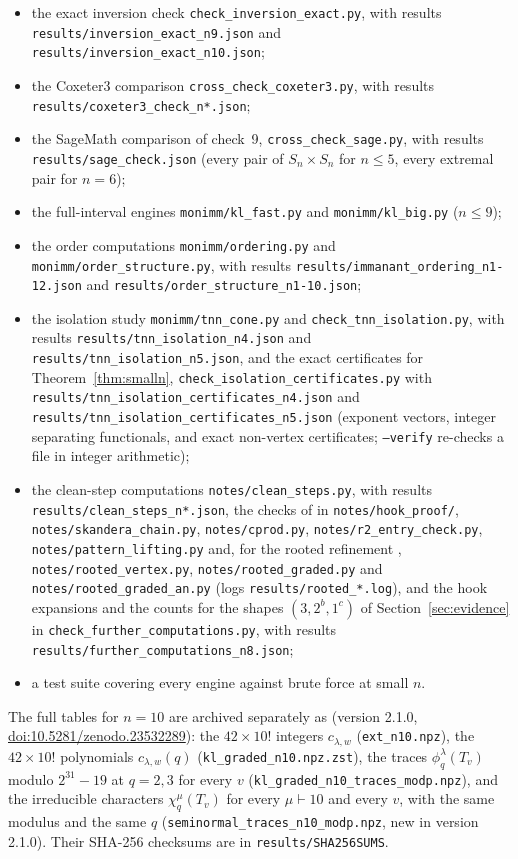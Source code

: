 \documentclass[11pt]{amsart}
\theoremstyle{definition}
\theoremstyle{remark}
\begin{document}
{\begin{itemize}
\item the exact inversion check \texttt{check\_inversion\_exact.py}, with results \texttt{results/inversion\_exact\_n9.json} and \texttt{results/inversion\_exact\_n10.json};
\item the \textsf{Coxeter3} comparison \texttt{cross\_check\_coxeter3.py}, with results \texttt{results/coxeter3\_check\_n*.json};
\item the SageMath comparison of check~9, \texttt{cross\_check\_sage.py}, with results \texttt{results/sage\_check.json} (every pair of $S_n\times S_n$ for $n\le5$, every extremal pair for $n=6$);
\item the full-interval engines \texttt{monimm/kl\_fast.py} and \texttt{monimm/kl\_big.py} ($n\le9$);
\item the order computations \texttt{monimm/ordering.py} and \texttt{monimm/order\_structure.py}, with results \texttt{results/immanant\_ordering\_n1-12.json} and \texttt{results/order\_structure\_n1-10.json};
\item the isolation study \texttt{monimm/tnn\_cone.py} and \texttt{check\_tnn\_isolation.py}, with results \texttt{results/tnn\_isolation\_n4.json} and \texttt{results/tnn\_isolation\_n5.json}, and the exact certificates for Theorem~\ref{thm:smalln}, \texttt{check\_isolation\_certificates.py} with \texttt{results/tnn\_isolation\_certificates\_n4.json} and \texttt{results/tnn\_isolation\_certificates\_n5.json} (exponent vectors, integer separating functionals, and exact non-vertex certificates; \texttt{--verify} re-checks a file in integer arithmetic);
\item the clean-step computations \texttt{notes/clean\_steps.py}, with results \texttt{results/clean\_steps\_n*.json}, the checks of \cite{McN} in \texttt{notes/hook\_proof/}, \texttt{notes/skandera\_chain.py}, \texttt{notes/cprod.py}, \texttt{notes/r2\_entry\_check.py}, \texttt{notes/pattern\_lifting.py} and, for the rooted refinement \cite[Conj.~10.2]{McN}, \texttt{notes/rooted\_vertex.py}, \texttt{notes/rooted\_graded.py} and \texttt{notes/rooted\_graded\_an.py} (logs \texttt{results/rooted\_*.log}), and the hook expansions and the counts for the shapes $(3,2^b,1^c)$ of Section~\ref{sec:evidence} in \texttt{check\_further\_computations.py}, with results \texttt{results/further\_computations\_n8.json};
\item a test suite covering every engine against brute force at small $n$.
\end{itemize}
The full tables for $n=10$ are archived separately as \cite{McNdata} (version 2.1.0, \href{https://doi.org/10.5281/zenodo.23532289}{doi:10.5281/zenodo.23532289}): the $42\times10!$ integers $c_{\lambda,w}$ (\texttt{ext\_n10.npz}), the $42\times10!$ polynomials $c_{\lambda,w}(q)$ (\texttt{kl\_graded\_n10.npz.zst}), the traces $\phi^\lambda_q(T_v)$ modulo $2^{31}-19$ at $q=2,3$ for every $v$ (\texttt{kl\_graded\_n10\_traces\_modp.npz}), and the irreducible characters $\chi^\mu_q(T_v)$ for every $\mu\vdash10$ and every $v$, with the same modulus and the same $q$ (\texttt{seminormal\_traces\_n10\_modp.npz}, new in version 2.1.0). Their SHA-256 checksums are in \texttt{results/SHA256SUMS}.

}
\end{document}
